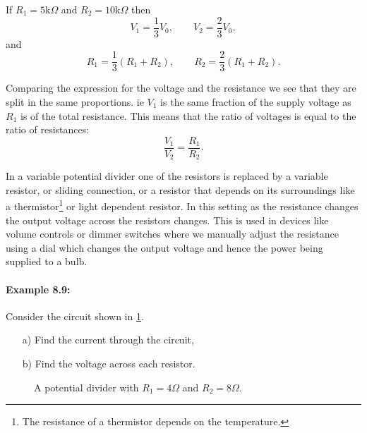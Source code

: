 \documentclass[a4paper,12pt]{book}
\begin{document}
If $R_{1}=5\text{k}\Omega$ and $R_{2}=10\text{k}\Omega$ then
\begin{equation*}
V_{1}=\frac{1}{3}V_{0}, \qquad V_{2}=\frac{2}{3}V_{0},
\end{equation*}
and 
\begin{equation*}
R_{1}=\frac{1}{3}\left(R_{1}+R_{2}\right), \qquad R_{2}=\frac{2}{3}\left(R_{1}+R_{2}\right).
\end{equation*}

Comparing the expression for the voltage and the resistance we see that they are split in the same proportions. ie $V_{1}$ is the same fraction of the supply voltage as $R_{1}$ is of the total resistance. This means that the ratio of voltages is equal to the ratio of resistances:
\begin{equation}
\frac{V_{1}}{V_{2}}=\frac{R_{1}}{R_{2}}.
\label{eq: voltage ratios}
\end{equation}

In a variable potential divider one of the resistors is replaced by a variable resistor, or sliding connection, or a resistor that depends on its surroundings like a thermistor\footnote{The resistance of a thermistor depends on the temperature.} or  light dependent resistor. In this setting as the resistance changes the output voltage across the resistors changes. This is used in devices like volume controls or dimmer switches where we manually adjust the resistance using a dial which changes the output voltage and hence the power being supplied to a bulb.\\

\paragraph{Example 8.9:} Consider the circuit shown in \cref{fig: pd example}.
\begin{itemize}
\setlength{\itemsep}{-5pt}
    \item[a)] Find the current through the circuit,
    \item[b)] Find the voltage across each resistor.
\end{itemize}  
 \begin{figure}[ht]
    \centering
    \caption{A potential divider with $R_{1}=4\Omega$ and $R_{2}=8\Omega$.}
    \label{fig: pd example}
\end{figure}
\end{document}
